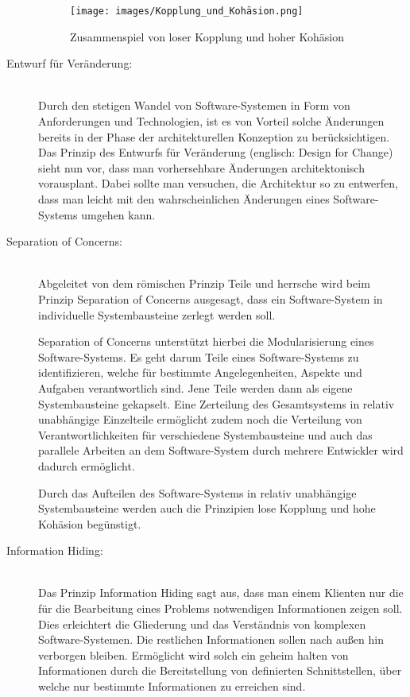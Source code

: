 \begin{description}
    \begin{figure}[H]
        \centering
        \texttt{[image: images/Kopplung\_und\_Kohäsion.png]}
        \caption{Zusammenspiel von loser Kopplung und hoher Kohäsion \cite{Vogel.2009}}
        \label{fig:kopplung_and_kohaesion}
    \end{figure}

    \item[Entwurf für Veränderung:]\hfill \\
    Durch den stetigen Wandel von Software-Systemen in Form von Anforderungen und Technologien, ist es von Vorteil solche Änderungen bereits in der Phase der architekturellen Konzeption zu berücksichtigen. Das Prinzip des Entwurfs für Veränderung (englisch: Design for Change) sieht nun vor, dass man vorhersehbare Änderungen architektonisch vorausplant. Dabei sollte man versuchen, die Architektur so zu entwerfen, dass man leicht mit den wahrscheinlichen Änderungen eines Software-Systems umgehen kann.

    \item[Separation of Concerns:]\hfill \\
    Abgeleitet von dem römischen Prinzip \glqq Teile und herrsche\grqq{} wird beim Prinzip Separation of Concerns ausgesagt, dass ein Software-System in individuelle Systembausteine zerlegt werden soll.

    Separation of Concerns unterstützt hierbei die Modularisierung eines Software-Systems. Es geht darum Teile eines Software-Systems zu identifizieren, welche für bestimmte Angelegenheiten, Aspekte und Aufgaben verantwortlich sind. Jene Teile werden dann als eigene Systembausteine gekapselt. Eine Zerteilung des Gesamtsystems in relativ unabhängige Einzelteile ermöglicht zudem noch die Verteilung von Verantwortlichkeiten für verschiedene Systembausteine und auch das parallele Arbeiten an dem Software-System durch mehrere Entwickler wird dadurch ermöglicht.

    Durch das Aufteilen des Software-Systems in relativ unabhängige Systembausteine werden auch die Prinzipien lose Kopplung und hohe Kohäsion begünstigt.

    \item[Information Hiding:]\hfill \\
    Das Prinzip Information Hiding sagt aus, dass man einem Klienten nur die für die Bearbeitung eines Problems notwendigen Informationen zeigen soll. Dies erleichtert die Gliederung und das Verständnis von komplexen Software-Systemen. Die restlichen Informationen sollen nach außen hin verborgen bleiben. Ermöglicht wird solch ein geheim halten von Informationen durch die Bereitstellung von definierten Schnittstellen, über welche nur bestimmte Informationen zu erreichen sind.


\end{description}
